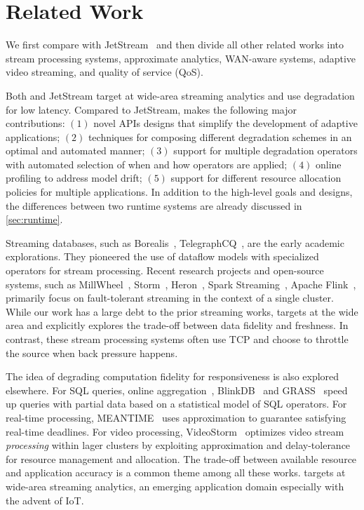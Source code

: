 \section{Related Work}
\label{sec:related-work}

We first compare \sysname{} with JetStream~\cite{rabkin2014aggregation} and then
divide all other related works into stream processing systems, approximate
analytics, WAN-aware systems, adaptive video streaming, and quality of service
(QoS).

 Both \sysname{} and JetStream target at wide-area streaming
analytics and use degradation for low latency. Compared to JetStream, \sysname{}
makes the following major contributions: $(1)$ novel APIs designs that simplify
the development of adaptive applications; $(2)$ techniques for composing
different degradation schemes in an optimal and automated manner; $(3)$ support
for multiple degradation operators with automated selection of when and how
operators are applied; $(4)$ online profiling to address model drift; $(5)$
support for different resource allocation policies for multiple applications. In
addition to the high-level goals and designs, the differences between two
runtime systems are already discussed in \autoref{sec:runtime}.

 Streaming databases, such as
Borealis~\cite{abadi2005design},
TelegraphCQ~\cite{chandrasekaran2003telegraphcq}, are the early academic
explorations. They pioneered the use of dataflow models with specialized
operators for stream processing. Recent research projects and open-source
systems, such as MillWheel~\cite{akidau2013millwheel},
Storm~\cite{toshniwal2014storm}, Heron~\cite{sanjeev2015twitter}, Spark
Streaming~\cite{zaharia2013discretized}, Apache Flink~\cite{carbone2015apache},
primarily focus on fault-tolerant streaming in the context of a single
cluster. While our work has a large debt to the prior streaming works,
\sysname{} targets at the wide area and explicitly explores the trade-off
between data fidelity and freshness. In contrast, these stream processing
systems often use TCP and choose to throttle the source when back pressure
happens.

 The idea of degrading computation fidelity for
responsiveness is also explored elsewhere. For SQL queries, online
aggregation~\cite{hellerstein1997online}, BlinkDB~\cite{agarwal2013blinkdb} and
GRASS~\cite{ananthanarayanan2014grass} speed up queries with partial data based
on a statistical model of SQL operators. For real-time processing,
MEANTIME~\cite{farrell2016meantime} uses approximation to guarantee satisfying
real-time deadlines. For video processing, VideoStorm~\cite{zhang2017live}
optimizes video stream \textit{processing} within lager clusters by exploiting
approximation and delay-tolerance for resource management and allocation. The
trade-off between available resource and application accuracy is a common theme
among all these works. \sysname{} targets at wide-area streaming analytics, an
emerging application domain especially with the advent of IoT\@.

